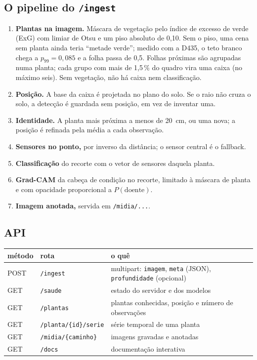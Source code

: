 \documentclass[11pt,a4paper]{article}
\newcommand{\cod}[1]{\texttt{#1}}
\begin{document}
\subsection{O pipeline do \texttt{/ingest}}
\begin{enumerate}
  \item \textbf{Plantas na imagem.} Máscara de vegetação pelo índice de excesso de
  verde (ExG) com limiar de Otsu e um piso absoluto de 0,10. Sem o piso, uma cena sem
  planta ainda teria ``metade verde''; medido com a D435, o teto branco chega a
  $p_{99} = 0{,}085$ e a folha passa de 0,5. Folhas próximas são agrupadas numa
  planta; cada grupo com mais de 1,5\,\% do quadro vira uma caixa (no máximo seis).
  Sem vegetação, não há caixa nem classificação.
  \item \textbf{Posição.} A base da caixa é projetada no plano do solo. Se o raio não
  cruza o solo, a detecção é guardada sem posição, em vez de inventar uma.
  \item \textbf{Identidade.} A planta mais próxima a menos de 20~cm, ou uma nova; a
  posição é refinada pela média a cada observação.
  \item \textbf{Sensores no ponto,} por inverso da distância; o sensor central é o
  fallback.
  \item \textbf{Classificação} do recorte com o vetor de sensores daquela planta.
  \item \textbf{Grad-CAM} da cabeça de condição no recorte, limitado à máscara de
  planta e com opacidade proporcional a $P(\text{doente})$.
  \item \textbf{Imagem anotada,} servida em \cod{/midia/...}.
\end{enumerate}

\subsection{API}
\begin{table}[h]
\centering\small
\begin{tabularx}{\linewidth}{@{}llX@{}}
\toprule
método & rota & o quê \\
\midrule
POST & \cod{/ingest} & multipart: \cod{imagem}, \cod{meta} (JSON), \cod{profundidade} (opcional) \\
GET & \cod{/saude} & estado do servidor e dos modelos \\
GET & \cod{/plantas} & plantas conhecidas, posição e número de observações \\
GET & \cod{/planta/\{id\}/serie} & série temporal de uma planta \\
GET & \cod{/midia/\{caminho\}} & imagens gravadas e anotadas \\
GET & \cod{/docs} & documentação interativa \\
\bottomrule
\end{tabularx}
\end{table}
\end{document}
